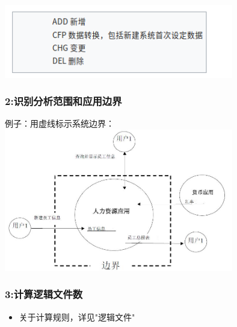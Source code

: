 \begin{description}
\item[]
\end{description}


\includegraphics[width=10cm]{Screenshotfrom20221219021338.png}

\hypertarget{ux8bc6ux522bux5206ux6790ux8303ux56f4ux548cux5e94ux7528ux8fb9ux754c}{%
\subsubsection{2:识别分析范围和应用边界}\label{ux8bc6ux522bux5206ux6790ux8303ux56f4ux548cux5e94ux7528ux8fb9ux754c}}

例子：用虚线标示系统边界：\\

\includegraphics[width=10cm]{功能点计数P6220.jpg}


\hypertarget{ux8ba1ux7b97ux903bux8f91ux6587ux4ef6ux6570}{%
\subsubsection{3:计算逻辑文件数}\label{ux8ba1ux7b97ux903bux8f91ux6587ux4ef6ux6570}}

\begin{itemize}
\tightlist
\item
  关于计算规则，详见"逻辑文件"
\end{itemize}

